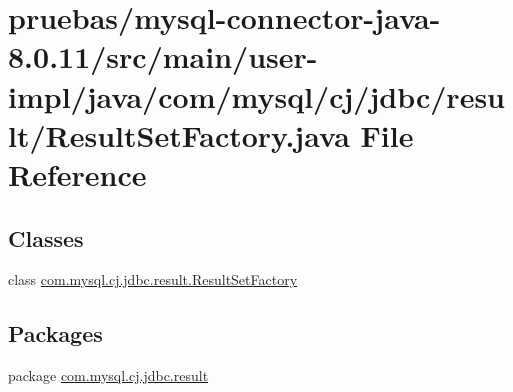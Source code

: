 \hypertarget{user-impl_2java_2com_2mysql_2cj_2jdbc_2result_2_resultset_factory_8java}{}\section{pruebas/mysql-\/connector-\/java-\/8.0.11/src/main/user-\/impl/java/com/mysql/cj/jdbc/result/\+Result\+Set\+Factory.java File Reference}
\label{user-impl_2java_2com_2mysql_2cj_2jdbc_2result_2_resultset_factory_8java}
\subsection*{Classes}
\begin{DoxyCompactItemize}
\item 
class \mbox{\hyperlink{classcom_1_1mysql_1_1cj_1_1jdbc_1_1result_1_1_result_set_factory}{com.\+mysql.\+cj.\+jdbc.\+result.\+Result\+Set\+Factory}}
\end{DoxyCompactItemize}
\subsection*{Packages}
\begin{DoxyCompactItemize}
\item 
package \mbox{\hyperlink{namespacecom_1_1mysql_1_1cj_1_1jdbc_1_1result}{com.\+mysql.\+cj.\+jdbc.\+result}}
\end{DoxyCompactItemize}
